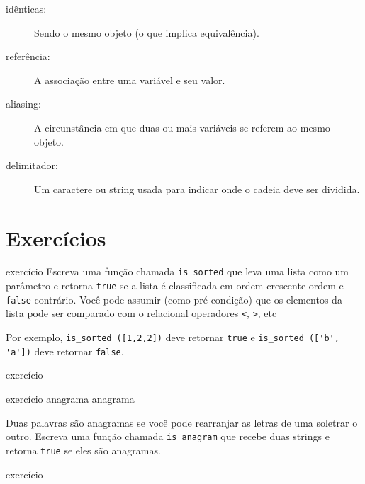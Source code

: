 \documentclass[10pt]{book}
\begin{document}
\begin{description}
\item[idênticas:] Sendo o mesmo objeto (o que implica equivalência).

\item[referência:] A associação entre uma variável e seu valor.

\item[aliasing:] A circunstância em que duas ou mais variáveis ​​se referem ao mesmo
objeto.

\item[delimitador:] Um caractere ou string usada para indicar onde o
cadeia deve ser dividida.

\end{description}


\section{Exercícios}

\begin{} exercício
Escreva uma função chamada \verb "is_sorted" que leva uma lista como um
parâmetro e retorna {\tt true} se a lista é classificada em ordem crescente
ordem e {\tt false} contrário. Você pode assumir (como pré-condição)
que os elementos da lista pode ser comparado com o relacional
operadores {\tt <}, {\tt>}, etc

Por exemplo, \verb "is_sorted ([1,2,2])" deve retornar {\tt true}
e \verb "is_sorted (['b', 'a'])" deve retornar {\tt false}.
\end{} exercício


\begin{} exercício
\label{} anagrama
\index{} anagrama

Duas palavras são anagramas se você pode rearranjar as letras de uma
soletrar o outro. Escreva uma função chamada \verb "is_anagram"
que recebe duas strings e retorna {\tt true} se eles são anagramas.
\end{} exercício
\end{document}
